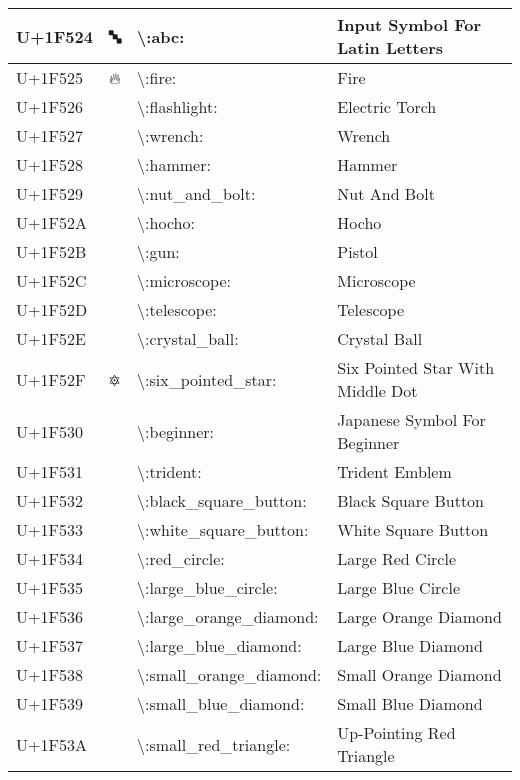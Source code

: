 \begin{table}[h]
\begin{tabulary}{\linewidth}{|L|L|L|L|}
\hline
U+1F524 & 🔤 & {\textbackslash}:abc: & Input Symbol For Latin Letters \\
\hline
U+1F525 & 🔥 & {\textbackslash}:fire: & Fire \\
\hline
U+1F526 & 🔦 & {\textbackslash}:flashlight: & Electric Torch \\
\hline
U+1F527 & 🔧 & {\textbackslash}:wrench: & Wrench \\
\hline
U+1F528 & 🔨 & {\textbackslash}:hammer: & Hammer \\
\hline
U+1F529 & 🔩 & {\textbackslash}:nut\_and\_bolt: & Nut And Bolt \\
\hline
U+1F52A & 🔪 & {\textbackslash}:hocho: & Hocho \\
\hline
U+1F52B & 🔫 & {\textbackslash}:gun: & Pistol \\
\hline
U+1F52C & 🔬 & {\textbackslash}:microscope: & Microscope \\
\hline
U+1F52D & 🔭 & {\textbackslash}:telescope: & Telescope \\
\hline
U+1F52E & 🔮 & {\textbackslash}:crystal\_ball: & Crystal Ball \\
\hline
U+1F52F & 🔯 & {\textbackslash}:six\_pointed\_star: & Six Pointed Star With Middle Dot \\
\hline
U+1F530 & 🔰 & {\textbackslash}:beginner: & Japanese Symbol For Beginner \\
\hline
U+1F531 & 🔱 & {\textbackslash}:trident: & Trident Emblem \\
\hline
U+1F532 & 🔲 & {\textbackslash}:black\_square\_button: & Black Square Button \\
\hline
U+1F533 & 🔳 & {\textbackslash}:white\_square\_button: & White Square Button \\
\hline
U+1F534 & 🔴 & {\textbackslash}:red\_circle: & Large Red Circle \\
\hline
U+1F535 & 🔵 & {\textbackslash}:large\_blue\_circle: & Large Blue Circle \\
\hline
U+1F536 & 🔶 & {\textbackslash}:large\_orange\_diamond: & Large Orange Diamond \\
\hline
U+1F537 & 🔷 & {\textbackslash}:large\_blue\_diamond: & Large Blue Diamond \\
\hline
U+1F538 & 🔸 & {\textbackslash}:small\_orange\_diamond: & Small Orange Diamond \\
\hline
U+1F539 & 🔹 & {\textbackslash}:small\_blue\_diamond: & Small Blue Diamond \\
\hline
U+1F53A & 🔺 & {\textbackslash}:small\_red\_triangle: & Up-Pointing Red Triangle \\

\end{tabulary}
\end{table}
